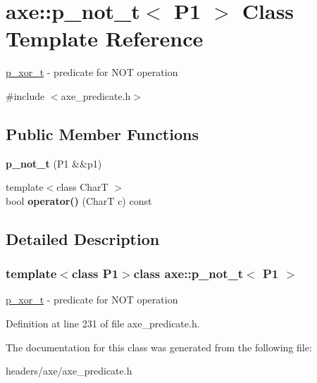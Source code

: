\hypertarget{classaxe_1_1p__not__t}{\section{axe\+:\+:p\+\_\+not\+\_\+t$<$ P1 $>$ Class Template Reference}
\label{classaxe_1_1p__not__t}
}


\hyperlink{classaxe_1_1p__xor__t}{p\+\_\+xor\+\_\+t} -\/ predicate for N\+O\+T operation  




{\ttfamily \#include $<$axe\+\_\+predicate.\+h$>$}

\subsection*{Public Member Functions}
\begin{DoxyCompactItemize}
\item 
\hypertarget{classaxe_1_1p__not__t_a2c3975c6f3e7cd1c0fe709786c806a4b}{{\bfseries p\+\_\+not\+\_\+t} (P1 \&\&p1)}\label{classaxe_1_1p__not__t_a2c3975c6f3e7cd1c0fe709786c806a4b}

\item 
\hypertarget{classaxe_1_1p__not__t_ad97f78fab980e008b2cba278fd511a87}{{\footnotesize template$<$class Char\+T $>$ }\\bool {\bfseries operator()} (Char\+T c) const }\label{classaxe_1_1p__not__t_ad97f78fab980e008b2cba278fd511a87}

\end{DoxyCompactItemize}


\subsection{Detailed Description}
\subsubsection*{template$<$class P1$>$class axe\+::p\+\_\+not\+\_\+t$<$ P1 $>$}

\hyperlink{classaxe_1_1p__xor__t}{p\+\_\+xor\+\_\+t} -\/ predicate for N\+O\+T operation 

Definition at line 231 of file axe\+\_\+predicate.\+h.



The documentation for this class was generated from the following file\+:\begin{DoxyCompactItemize}
\item 
headers/axe/axe\+\_\+predicate.\+h\end{DoxyCompactItemize}

